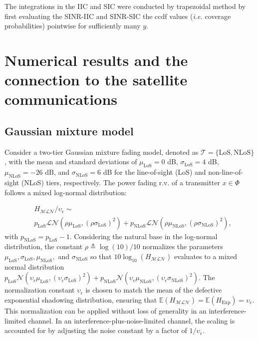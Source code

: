 \documentclass[lettersize,journal]{IEEEtran}
\begin{document}
The integrations in the IIC and SIC were conducted by trapezoidal method by first evaluating the SINR-IIC and SINR-SIC the ccdf values (\textit{i.e.} coverage probabilities) pointwise for sufficiently many $y$.






\section{Numerical results and the connection to the satellite communications}
\label{sec:numericalresultsandconnectiontoLEO}



\subsection{Gaussian mixture model}

Consider a two-tier Gaussian mixture fading model, denoted as $\mathcal{T} = \{\text{LoS}, \text{NLoS}\}$, with the mean and standard deviations of $\mu_{\text{LoS}} = 0$ dB, $\sigma_{\text{LoS}} = 4$ dB, $\mu_{\text{NLoS}} = -26$ dB, and $\sigma_{\text{NLoS}} = 6$ dB for the line-of-sight (LoS) and non-line-of-sight (NLoS) tiers, respectively. The power fading r.v. of a transmitter $x \in \Phi$ follows a mixed log-normal distribution:


\begin{align}
  \label{eq:tier2lognormal}
  &H_{\mathcal{M}\mathcal{L}\mathcal{N}}/\upsilon_{\epsilon} \sim \nonumber\\ & p_{\text{LoS}}\mathcal{L}\mathcal{N}(\rho\mu_{\text{LoS}},(\rho \sigma_{\text{LoS}})^2) +p_{\text{NLoS}}\mathcal{L}\mathcal{N}(\rho\mu_{\text{NLoS}},(\rho \sigma_{\text{NLoS}})^2),
\end{align}
with $p_{\text{NLoS}}=p_{\text{LoS}}-1$.
Considering the natural base in the log-normal distribution, the constant $\rho \triangleq \log(10)/10$ normalizes the parameters $\mu_{\text{LoS}}, \sigma_{\text{LoS}}, \mu_{\text{NLoS}},$ and $\sigma_{\text{NLoS}}$ so that $10 \log_{10}(H_{\mathcal{M}\mathcal{L} \mathcal{N}})$ evaluates to a mixed normal distribution $p_{\text{LoS}} \mathcal{N}(\upsilon_{\epsilon}\mu_{\text{LoS}}, (\upsilon_{\epsilon}\sigma_{\text{LoS}})^2) + p_{\text{NLoS}} \mathcal{N}(\upsilon_{\epsilon} \mu_{\text{NLoS}}, (\upsilon_{\epsilon}\sigma_{\text{NLoS}})^2)$. The normalization constant $\upsilon_{\epsilon}$ is chosen to match the mean of the defective exponential shadowing distribution, ensuring that $\mathbb{E}(H_{\mathcal{M}\mathcal{L}\mathcal{N}}) = \mathbb{E}(H_{\text{Exp}}) = \upsilon_{\epsilon}$. This normalization can be applied without loss of generality in an interference-limited channel. In an interference-plus-noise-limited channel, the scaling is accounted for by adjusting the noise constant by a factor of $1/\upsilon_{\epsilon}$.
\end{document}
